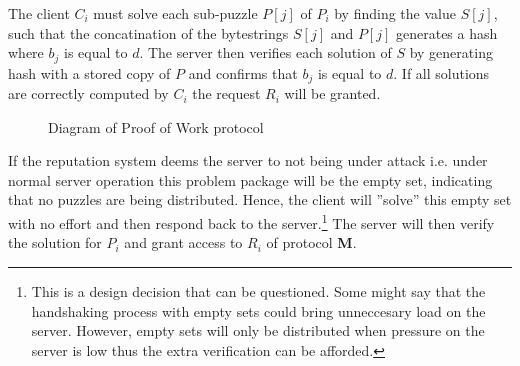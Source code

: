  The client $C_i$ must solve each sub-puzzle $P[j]$ of $P_i$ by finding the value $S[j]$, such that the concatination of the bytestrings $S[j]$ and $P[j]$ generates a hash where $b_j$ is equal to $d$. The server then verifies each solution of $S$ by generating hash with a stored copy of $P$ and confirms that $b_j$ is equal to $d$. If all solutions are correctly computed by $C_i$ the request $R_i$ will be granted. 

\begin{figure}
	\begin{center}
		 \vspace{10pt}
		\caption{Diagram of Proof of Work protocol}\label{tab:protocol}
	 \end{center}
\end{figure}


  If the reputation system deems the server to not being under attack i.e. under normal server operation this problem package will be the empty set, indicating that no puzzles are being distributed. Hence, the client will ''solve'' this empty set with no effort and then respond back to the server.\footnote{This is a design decision that can be questioned. Some might say that the handshaking process with empty sets could bring unneccesary load on the server. However, empty sets will only be distributed when pressure on the server is low thus the extra verification can be afforded.} The server will then verify the solution for $P_i$ and grant access to $R_i$ of protocol \textbf{M}.


